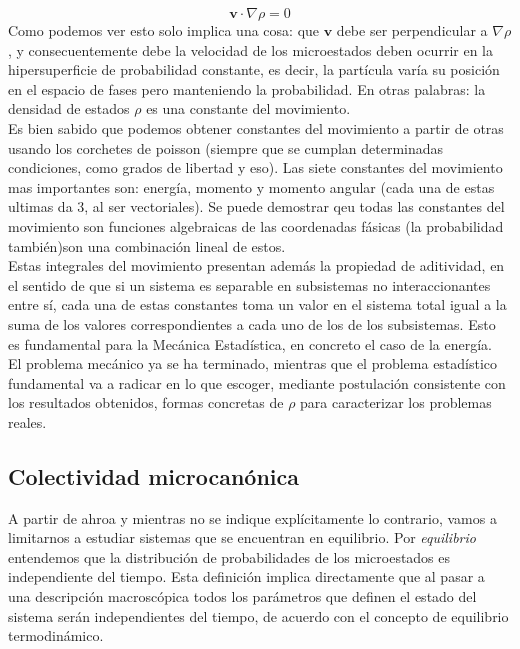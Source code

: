 \documentclass[12pt,a4paper]{article}
\numberwithin{equation}{section}
\numberwithin{figure}{section}
\newcommand{\vn}{\mathbf{v}}
\theoremstyle{definition}
\begin{document}
\begin{equation}
\vn \cdot \nabla \rho = 0
\end{equation}
Como podemos ver esto solo implica una cosa: que $\vn$ debe ser perpendicular a $\nabla \rho$, y consecuentemente debe la velocidad de los microestados deben ocurrir en la hipersuperficie de probabilidad constante, es decir, la partícula varía su posición en el espacio de fases pero manteniendo la probabilidad. En otras palabras: la densidad de estados $\rho$ es una constante del movimiento. \\

Es bien sabido que podemos obtener constantes del movimiento a partir de otras usando los corchetes de poisson (siempre que se cumplan determinadas condiciones, como grados de libertad y eso). Las siete constantes del movimiento mas importantes son: energía, momento y momento angular (cada una de estas ultimas da 3, al ser vectoriales). Se puede demostrar qeu todas las constantes  del movimiento son funciones algebraicas de las coordenadas fásicas (la probabilidad también)son una combinación lineal de estos. \\

Estas integrales del movimiento presentan además la propiedad de aditividad, en el sentido de que si un sistema es separable en subsistemas no interaccionantes entre sí, cada una de estas constantes toma un valor en el sistema total igual a la suma de los valores correspondientes a cada uno de los de los subsistemas. Esto es fundamental para la Mecánica Estadística, en concreto el caso de la energía.  \\

El problema mecánico ya se ha terminado, mientras que el problema estadístico fundamental va a radicar en lo que escoger, mediante postulación consistente con los resultados obtenidos, formas concretas de $\rho$ para caracterizar los problemas reales. 

\subsection{Colectividad microcanónica}

A partir de ahroa y mientras no se indique explícitamente lo contrario, vamos a limitarnos a estudiar sistemas que se encuentran en equilibrio. Por \textit{equilibrio} entendemos que la distribución de probabilidades de los microestados es independiente del tiempo. Esta definición implica directamente que al pasar a una descripción macroscópica todos los parámetros que definen el estado del sistema serán independientes del tiempo, de acuerdo con el concepto de equilibrio termodinámico. \\
\end{document}
